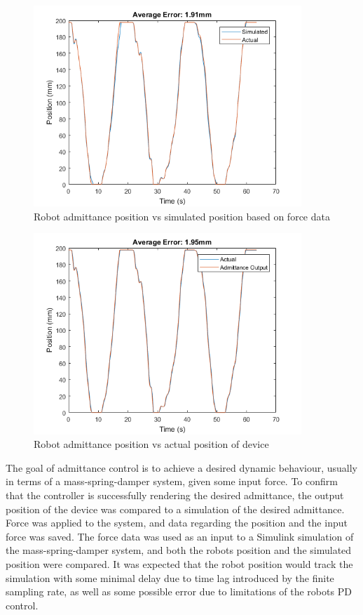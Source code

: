 \documentclass[12pt]{report}
\begin{document}
	
	\begin{figure}[h]
	\centering
	\includegraphics[width=0.9\textwidth]{admittance_sim}
	\caption{Robot admittance position vs simulated position based on force data}
	\label{fig:adm_sim}
\end{figure}	

\begin{figure}[h]
	\centering
	\includegraphics[width=0.9\textwidth]{admittance_v_position}
	\caption{Robot admittance position vs actual position of device}
	\label{fig:adm_pos}
\end{figure}	
	
		
	The goal of admittance control is to achieve a desired dynamic behaviour, usually in terms of a mass-spring-damper system, given some input force. To confirm that the controller is successfully rendering the desired admittance, the output position of the device was compared to a simulation of the desired admittance. Force was applied to the system, and data regarding the position and the input force was saved. The force data was used as an input to a Simulink simulation of the mass-spring-damper system, and both the robots position and the simulated position were compared. It was expected that the robot position would track the simulation with some minimal delay due to time lag introduced by the finite sampling rate, as well as some possible error due to limitations of the robots PD control. 
	
\end{document}
